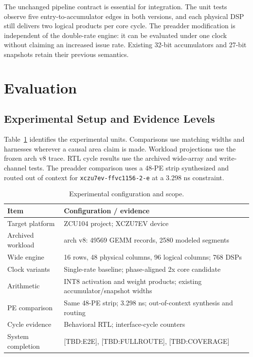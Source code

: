 \documentclass[10pt,conference,letterpaper]{IEEEtran}
\newcommand{\pending}[1]{\textcolor{red!65!black}{\textsf{[TBD:#1]}}}
\begin{document}
The unchanged pipeline contract is essential for integration. The unit tests observe five entry-to-accumulator edges in both versions, and each physical DSP still delivers two logical products per core cycle. The preadder modification is independent of the double-rate engine: it can be evaluated under one clock without claiming an increased issue rate. Existing 32-bit accumulators and 27-bit snapshots retain their previous semantics.


\section{Evaluation}
\subsection{Experimental Setup and Evidence Levels}
Table~\ref{tab:setup} identifies the experimental units. Comparisons use matching widths and harnesses wherever a causal area claim is made. Workload projections use the frozen arch v8 trace. RTL cycle results use the archived wide-array and write-channel tests. The preadder comparison uses a 48-PE strip synthesized and routed out of context for \texttt{xczu7ev-ffvc1156-2-e} at a 3.298 ns constraint.

\begin{table}[t]\centering\caption{Experimental configuration and scope.}\label{tab:setup}
\begin{tabular}{p{}p{}}\toprule
Item & Configuration / evidence \\\midrule
Target platform & ZCU104 project; XCZU7EV device \\
Archived workload & arch v8: 49569 GEMM records, 2580 modeled segments \\
Wide engine & 16 rows, 48 physical columns, 96 logical columns; 768 DSPs \\
Clock variants & Single-rate baseline; phase-aligned 2x core candidate \\
Arithmetic & INT8 activation and weight products; existing accumulator/snapshot widths \\
PE comparison & Same 48-PE strip; 3.298 ns; out-of-context synthesis and routing \\
Cycle evidence & Behavioral RTL; interface-cycle counters \\
System completion & \pending{E2E}, \pending{FULLROUTE}, \pending{COVERAGE} \\\bottomrule
\end{tabular}\end{table}
\end{document}

